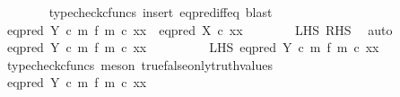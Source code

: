 \begin{isabellebody}
\ \ \ \ \ \ \isamarkupfalse%
\ {\isacharparenleft}{\kern0pt}typecheck{\isacharunderscore}{\kern0pt}cfuncs{\isacharcomma}{\kern0pt}\ insert\ eq{\isacharunderscore}{\kern0pt}pred{\isacharunderscore}{\kern0pt}iff{\isacharunderscore}{\kern0pt}eq{\isacharcomma}{\kern0pt}\ blast{\isacharparenright}{\kern0pt}\isanewline
\ \ \ \ \isamarkupfalse%
\ {\isachardoublequoteopen}{\isacharparenleft}{\kern0pt}eq{\isacharunderscore}{\kern0pt}pred\ Y\ {\isasymcirc}\isactrlsub c\ m\ {\isasymtimes}\isactrlsub f\ m{\isacharparenright}{\kern0pt}\ {\isasymcirc}\isactrlsub c\ {\isasymlangle}x{}{\isacharcomma}{\kern0pt}x{}{\isasymrangle}\ {\isacharequal}{\kern0pt}\ eq{\isacharunderscore}{\kern0pt}pred\ X\ {\isasymcirc}\isactrlsub c\ {\isasymlangle}x{}{\isacharcomma}{\kern0pt}x{}{\isasymrangle}{\isachardoublequoteclose}\isanewline
\ \ \ \ \ \ \isamarkupfalse%
\ LHS\ RHS\ \isamarkupfalse%
\ auto\isanewline
\ \ \isamarkupfalse%
\isanewline
\ \ \ \ \isamarkupfalse%
\ {\isachardoublequoteopen}{\isacharparenleft}{\kern0pt}eq{\isacharunderscore}{\kern0pt}pred\ Y\ {\isasymcirc}\isactrlsub c\ m\ {\isasymtimes}\isactrlsub f\ m{\isacharparenright}{\kern0pt}\ {\isasymcirc}\isactrlsub c\ {\isasymlangle}x{}{\isacharcomma}{\kern0pt}x{}{\isasymrangle}\ {\isasymnoteq}\ {\isasymt}{\isachardoublequoteclose}\isanewline
\ \ \ \ \isamarkupfalse%
\ \isamarkupfalse%
\ LHS{\isacharcolon}{\kern0pt}\ {\isachardoublequoteopen}{\isacharparenleft}{\kern0pt}eq{\isacharunderscore}{\kern0pt}pred\ Y\ {\isasymcirc}\isactrlsub c\ m\ {\isasymtimes}\isactrlsub f\ m{\isacharparenright}{\kern0pt}\ {\isasymcirc}\isactrlsub c\ {\isasymlangle}x{}{\isacharcomma}{\kern0pt}x{}{\isasymrangle}\ {\isacharequal}{\kern0pt}\ {\isasymf}{\isachardoublequoteclose}\isanewline
\ \ \ \ \ \ \isamarkupfalse%
\ {\isacharparenleft}{\kern0pt}typecheck{\isacharunderscore}{\kern0pt}cfuncs{\isacharcomma}{\kern0pt}\ meson\ true{\isacharunderscore}{\kern0pt}false{\isacharunderscore}{\kern0pt}only{\isacharunderscore}{\kern0pt}truth{\isacharunderscore}{\kern0pt}values{\isacharparenright}{\kern0pt}\isanewline
\ \ \ \ \isamarkupfalse%
\ \isamarkupfalse%
\ {\isachardoublequoteopen}eq{\isacharunderscore}{\kern0pt}pred\ Y\ {\isasymcirc}\isactrlsub c\ {\isacharparenleft}{\kern0pt}m\ {\isasymtimes}\isactrlsub f\ m{\isacharparenright}{\kern0pt}\ {\isasymcirc}\isactrlsub c\ {\isasymlangle}x{}{\isacharcomma}{\kern0pt}x{}{\isasymrangle}\ {\isacharequal}{\kern0pt}\ {\isasymf}{\isachardoublequoteclose}\isanewline

\end{isabellebody}
